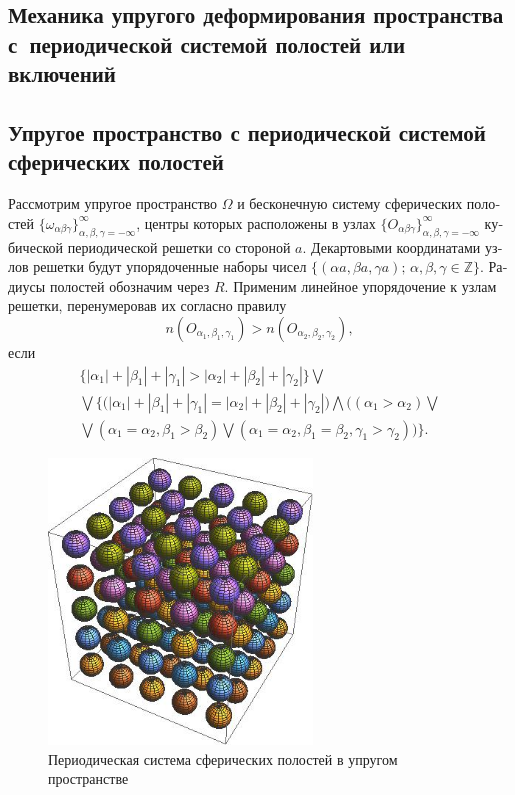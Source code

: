 
\begin{russian}
\chapter[Механика упругого деформирования пространства с периодической системой полостей или включений]{Механика упругого деформирования пространства с~периодической системой полостей или включений}

\section[Упругое пространство с периодической системой сферических полостей]{Упругое пространство с периодической системой сферических полостей}

Рассмотрим упругое пространство $\Omega$ и бесконечную систему сферических полостей $\{\omega_{\alpha\beta\gamma}\}_{\alpha,\beta,\gamma=-\infty}^\infty$, центры которых расположены в узлах $\{O_{\alpha\beta\gamma}\}_{\alpha,\beta,\gamma=-\infty}^\infty$ кубической периодической решетки со стороной $a$. Декартовыми координатами узлов решетки будут упорядоченные наборы чисел $\{(\alpha a,\beta a,\gamma a);\,\alpha,\beta,\gamma\in\mathbb{Z}\}$. Радиусы полостей обозначим через $R$. Применим линейное упорядочение к узлам решетки, перенумеровав их согласно правилу\sloppy
$$
n(O_{\alpha_1,\beta_1,\gamma_1})>n(O_{\alpha_2,\beta_2,\gamma_2}),
$$
если 
\begin{multline}
\bigg\{|\alpha_1|+|\beta_1|+|\gamma_1|>|\alpha_2|+|\beta_2|+|\gamma_2|\bigg\}\bigvee \\
\bigvee\bigg\{\Big(|\alpha_1|+|\beta_1|+|\gamma_1|=|\alpha_2|+|\beta_2|+|\gamma_2|\Big)\bigwedge\Big((\alpha_1>\alpha_2)\bigvee \\
\bigvee(\alpha_1=\alpha_2,\beta_1>\beta_2)\bigvee(\alpha_1=\alpha_2,\beta_1=\beta_2,\gamma_1>\gamma_2)\Big)\bigg\}.
\end{multline}

\begin{figure}[h!]
\centering
\includegraphics[width=7cm]{cav-125.jpg}
\caption{Периодическая система сферических полостей в упругом пространстве}
\label{f:11:1f}
\end{figure}


\end{russian}
